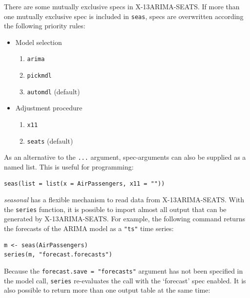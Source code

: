 There are some mutually exclusive specs in X-13ARIMA-SEATS. If more than
one mutually exclusive spec is included in \texttt{seas}, specs are
overwritten according the following priority rules:

\begin{itemize}
\itemsep1pt\parskip0pt
\item
  Model selection

  \begin{enumerate}
  \def\labelenumi{\arabic{enumi}.}
  \itemsep1pt\parskip0pt
  \item
    \texttt{arima}
  \item
    \texttt{pickmdl}
  \item
    \texttt{automdl} (default)
  \end{enumerate}
\item
  Adjustment procedure

  \begin{enumerate}
  \def\labelenumi{\arabic{enumi}.}
  \itemsep1pt\parskip0pt
  \item
    \texttt{x11}
  \item
    \texttt{seats} (default)
  \end{enumerate}
\end{itemize}

As an alternative to the \texttt{...} argument, spec-arguments can also
be supplied as a named list. This is useful for programming:

\begin{verbatim}
seas(list = list(x = AirPassengers, x11 = ""))
\end{verbatim}


\emph{seasonal} has a flexible mechanism to read data from
X-13ARIMA-SEATS. With the \texttt{series} function, it is possible to
import almost all output that can be generated by X-13ARIMA-SEATS. For
example, the following command returns the forecasts of the ARIMA model
as a \texttt{"ts"} time series:

\begin{verbatim}
m <- seas(AirPassengers)
series(m, "forecast.forecasts")
\end{verbatim}

Because the \texttt{forecast.save = "forecasts"} argument has not been
specified in the model call, \texttt{series} re-evaluates the call with
the `forecast' spec enabled. It is also possible to return more than one
output table at the same time:

